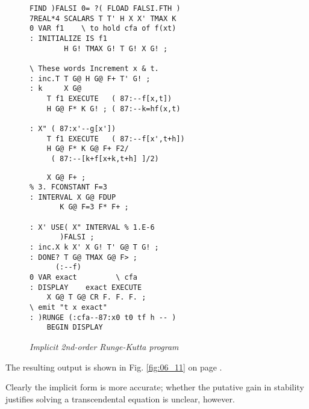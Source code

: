 \begin{figure}
    \tiny
    \begin{tcolorbox} [sidebyside, colback=white, sharp corners, enhanced, segmentation style=solid]
    \begin{lstlisting}
FIND )FALSI 0= ?( FLOAD FALSI.FTH )
7REAL*4 SCALARS T T' H X X' TMAX K
0 VAR f1    \ to hold cfa of f(xt)
: INITIALIZE IS f1
        H G! TMAX G! T G! X G! ;

\ These words Increment x & t.
: inc.T T G@ H G@ F+ T' G! ;
: k     X G@
    T f1 EXECUTE   ( 87:--f[x,t])
    H G@ F* K G! ; ( 87:--k=hf(x,t)

: X" ( 87:x'--g[x'])
    T f1 EXECUTE   ( 87:--f[x',t+h])
    H G@ F* K G@ F+ F2/
     ( 87:--[k+f[x+k,t+h] ]/2)
    \end{lstlisting}
\tcblower
    \begin{lstlisting}
    X G@ F+ ;
% 3. FCONSTANT F=3
: INTERVAL X G@ FDUP
       K G@ F=3 F* F+ ;

: X' USE( X" INTERVAL % 1.E-6
       )FALSI ;
: inc.X k X' X G! T' G@ T G! ;
: DONE? T G@ TMAX G@ F> ;
      (:--f)
0 VAR exact         \ cfa
: DISPLAY    exact EXECUTE
    X G@ T G@ CR F. F. F. ;
\ emit "t x exact"
: )RUNGE (:cfa--87:x0 t0 tf h -- )
    BEGIN DISPLAY
    \end{lstlisting}
    \end{tcolorbox}
    \caption{\textit{Implicit 2nd-order Runge-Kutta program}}
    \label{fig:06_10}
\end{figure}

The resulting output is shown in Fig. \ref{fig:06_11} on page \pageref{fig:06_11}.

Clearly the implicit form is more accurate; whether the putative gain in stability justifies solving a transcendental equation is unclear, however.


